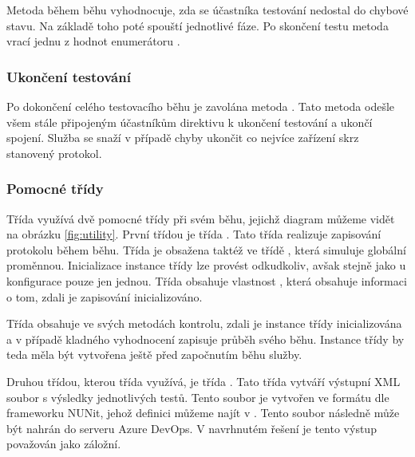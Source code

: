 Metoda během běhu vyhodnocuje, zda se účastníka testování nedostal do chybové stavu. Na základě toho poté spouští jednotlivé fáze. Po skončení testu metoda vrací jednu z hodnot enumerátoru . 

\subsubsection{Ukončení testování}

Po dokončení celého testovacího běhu je zavolána metoda . Tato metoda odešle všem stále připojeným účastníkům direktivu k ukončení testování a ukončí spojení. Služba se snaží v případě chyby ukončit co nejvíce zařízení skrz stanovený protokol.

\subsubsection{Pomocné třídy}
Třída  využívá dvě pomocné třídy při svém běhu, jejichž diagram můžeme vidět na obrázku \ref{fig:utility}. První třídou je třída . Tato třída realizuje zapisování protokolu během běhu. Třída je obsažena taktéž ve třídě , která simuluje globální proměnnou. Inicializace instance třídy  lze provést odkudkoliv, avšak stejně jako u konfigurace pouze jen jednou. Třída  obsahuje vlastnost , která obsahuje informaci o tom, zdali je zapisování inicializováno. 

Třída  obsahuje ve svých metodách kontrolu, zdali je instance třídy  inicializována a v případě kladného vyhodnocení zapisuje průběh svého běhu. Instance třídy  by teda měla být vytvořena ještě před započnutím běhu služby.

Druhou třídou, kterou třída  využívá, je třída . Tato třída vytváří výstupní XML soubor s výsledky jednotlivých testů.
Tento soubor je vytvořen ve formátu dle frameworku NUNit, jehož definici můžeme najít v \cite{nunit}. Tento soubor následně může být nahrán do serveru Azure DevOps. V navrhnutém řešení je tento výstup považován jako záložní.


